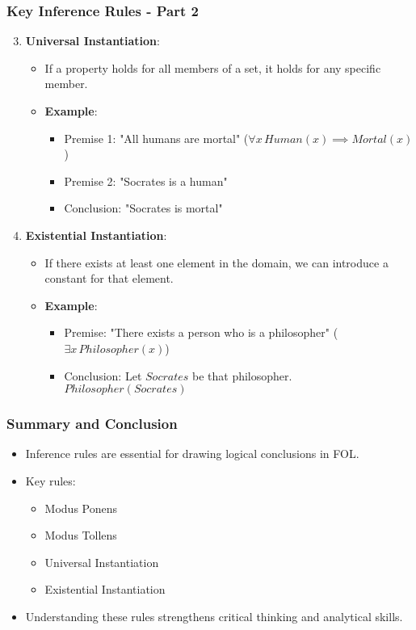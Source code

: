 \documentclass[aspectratio=169]{beamer}
\begin{document}
\begin{frame}[fragile]
    \frametitle{Key Inference Rules - Part 2}
    \begin{enumerate}
        \setcounter{enumi}{2} %
        \item \textbf{Universal Instantiation}:
        \begin{itemize}
            \item If a property holds for all members of a set, it holds for any specific member.
            \item \textbf{Example}:
            \begin{itemize}
                \item Premise 1: "All humans are mortal" (\( \forall x \, Human(x) \implies Mortal(x) \))
                \item Premise 2: "Socrates is a human"
                \item Conclusion: "Socrates is mortal"
            \end{itemize}
        \end{itemize}
        \item \textbf{Existential Instantiation}:
        \begin{itemize}
            \item If there exists at least one element in the domain, we can introduce a constant for that element.
            \item \textbf{Example}:
            \begin{itemize}
                \item Premise: "There exists a person who is a philosopher" (\( \exists x \, Philosopher(x) \))
                \item Conclusion: Let \( Socrates \) be that philosopher. \( Philosopher(Socrates) \)
            \end{itemize}
        \end{itemize}
    \end{enumerate}
\end{frame}

\begin{frame}[fragile]
    \frametitle{Summary and Conclusion}
    \begin{itemize}
        \item Inference rules are essential for drawing logical conclusions in FOL.
        \item Key rules:
        \begin{itemize}
            \item Modus Ponens
            \item Modus Tollens
            \item Universal Instantiation
            \item Existential Instantiation
        \end{itemize}
        \item Understanding these rules strengthens critical thinking and analytical skills.
    \end{itemize}
\end{frame}
\end{document}
